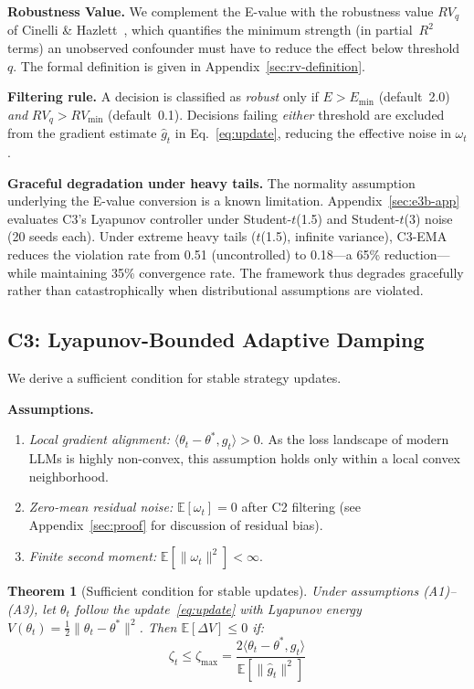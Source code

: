 \documentclass{article}
\newtheorem{theorem}{Theorem}
\begin{document}
\textbf{Robustness Value.} We complement the E-value with the
robustness value $RV_q$ of Cinelli \& Hazlett~\cite{cinelli2020},
which quantifies the minimum strength (in partial~$R^2$ terms) an
unobserved confounder must have to reduce the effect below
threshold~$q$. The formal definition is given in
Appendix~\ref{sec:rv-definition}.

\textbf{Filtering rule.} A decision is classified as \emph{robust}
only if $E > E_{\min}$ (default~2.0) \emph{and} $RV_q > RV_{\min}$
(default~0.1). Decisions failing \emph{either} threshold are
excluded from the gradient estimate $\hat{g}_t$ in
Eq.~\eqref{eq:update}, reducing the effective noise in $\omega_t$.

\textbf{Graceful degradation under heavy tails.}
The normality assumption underlying the E-value conversion is a known limitation. Appendix~\ref{sec:e3b-app} evaluates C3's Lyapunov controller under Student-$t$(1.5) and Student-$t$(3) noise (20 seeds each). Under extreme heavy tails ($t$(1.5), infinite variance), C3-EMA reduces the violation rate from 0.51 (uncontrolled) to 0.18---a 65\% reduction---while maintaining 35\% convergence rate. The framework thus degrades gracefully rather than catastrophically when distributional assumptions are violated.


\subsection{C3: Lyapunov-Bounded Adaptive Damping}
\label{sec:lyapunov}

We derive a sufficient condition for stable strategy updates.

\textbf{Assumptions.}
\begin{enumerate}
  \item[(A1)] \emph{Local gradient alignment:}
    $\langle \theta_t - \theta^*, g_t \rangle > 0$. As the loss landscape of modern LLMs is highly non-convex, this assumption holds only within a local convex neighborhood.
  \item[(A2)] \emph{Zero-mean residual noise:}
    $\mathbb{E}[\omega_t] = 0$ after C2 filtering (see
    Appendix~\ref{sec:proof} for discussion of residual bias).
  \item[(A3)] \emph{Finite second moment:}
    $\mathbb{E}[\|\omega_t\|^2] < \infty$.
\end{enumerate}

\begin{theorem}[Sufficient condition for stable updates]
\label{thm:lyapunov}
Under assumptions (A1)--(A3), let $\theta_t$ follow the
update~\eqref{eq:update} with Lyapunov energy
$V(\theta_t) = \tfrac{1}{2}\|\theta_t - \theta^*\|^2$.
Then $\mathbb{E}[\Delta V] \leq 0$ if:
\begin{equation}
  \zeta_t \leq \zeta_{\max} = \frac{2\langle \theta_t - \theta^*,
    g_t \rangle}{\mathbb{E}[\|\hat{g}_t\|^2]}
  \label{eq:zeta_max}
\end{equation}
\end{theorem}
\end{document}

